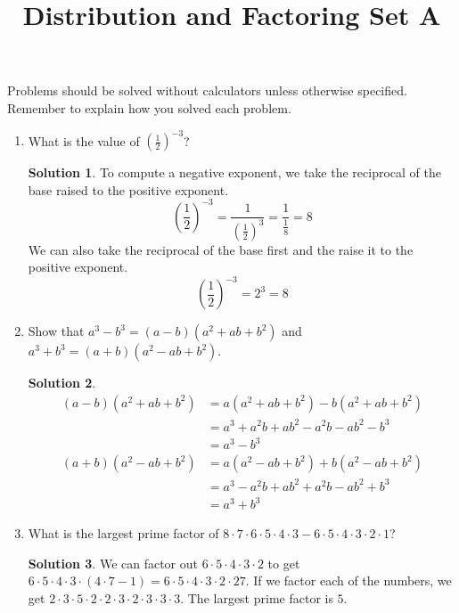 \documentclass{article}
\title{Distribution and Factoring Set A}
\author{}
\date{}
\theoremstyle{definition}
\newtheorem*{solution}{Solution}
\begin{document}
    \maketitle
    \noindent Problems should be solved without calculators unless otherwise specified. Remember to explain how you solved each problem.
    \begin{enumerate}
        \item What is the value of $\left(\frac{1}{2}\right)^{-3}$?
        \begin{solution}
            To compute a negative exponent, we take the reciprocal of the base raised to the positive exponent.
            \[\left(\frac{1}{2}\right)^{-3} = \frac{1}{\left(\frac{1}{2}\right)^3} = \frac{1}{\frac{1}{8}} = 8\]
            We can also take the reciprocal of the base first and the raise it to the positive exponent.
            \[\left(\frac{1}{2}\right)^{-3} = 2^3 = 8\]
        \end{solution}
        \item Show that $a^3 - b^3 = (a - b)(a^2 + ab + b^2)$ and $a^3 + b^3 = (a + b)(a^2 - ab + b^2)$.
        \begin{solution}
            \[\begin{split}
                (a - b)(a^2 + ab + b^2) & = a(a^2 + ab + b^2) - b(a^2 + ab + b^2) \\
                & = a^3 + a^2 b + ab^2 - a^2 b - ab^2 - b^3 \\
                & = a^3 - b^3
            \end{split}\]
            \[\begin{split}
                (a + b)(a^2 - ab + b^2) & = a(a^2 - ab + b^2) + b(a^2 - ab + b^2) \\
                & = a^3 - a^2 b + ab^2 + a^2 b - ab^2 + b^3 \\
                & = a^3 + b^3
            \end{split}\]
        \end{solution}
        \item What is the largest prime factor of $8 \cdot 7 \cdot 6 \cdot 5 \cdot 4 \cdot 3 - 6 \cdot 5 \cdot 4 \cdot 3 \cdot 2 \cdot 1$?
        \begin{solution}
            We can factor out $6 \cdot 5 \cdot 4 \cdot 3 \cdot 2$ to get $6 \cdot 5 \cdot 4 \cdot 3 \cdot (4 \cdot 7 - 1) = 6 \cdot 5 \cdot 4 \cdot 3 \cdot 2 \cdot 27$. If we factor each of the numbers, we get $2 \cdot 3 \cdot 5 \cdot 2 \cdot 2 \cdot 3 \cdot 2 \cdot 3 \cdot 3 \cdot 3$. The largest prime factor is $5$.

\end{solution}
\end{enumerate}
\end{document}
